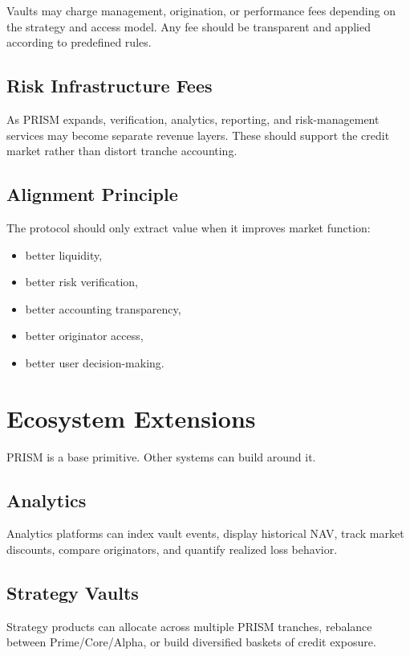 \documentclass[11pt]{article}
\begin{document}
Vaults may charge management, origination, or performance fees depending on the
strategy and access model. Any fee should be transparent and applied according
to predefined rules.

\subsection{Risk Infrastructure Fees}

As PRISM expands, verification, analytics, reporting, and risk-management
services may become separate revenue layers. These should support the credit
market rather than distort tranche accounting.

\subsection{Alignment Principle}

The protocol should only extract value when it improves market function:

\begin{itemize}
  \item better liquidity,
  \item better risk verification,
  \item better accounting transparency,
  \item better originator access,
  \item better user decision-making.
\end{itemize}

\section{Ecosystem Extensions}

PRISM is a base primitive. Other systems can build around it.

\subsection{Analytics}

Analytics platforms can index vault events, display historical NAV, track market
discounts, compare originators, and quantify realized loss behavior.

\subsection{Strategy Vaults}

Strategy products can allocate across multiple PRISM tranches, rebalance between
Prime/Core/Alpha, or build diversified baskets of credit exposure.
\end{document}
